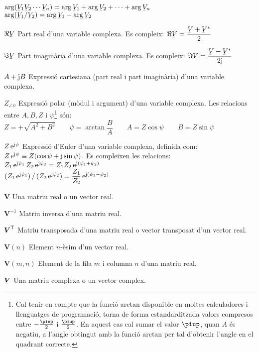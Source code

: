 \begin{list}{}
      $\arg(\cmplx{V}_1 \cmplx{V}_2 \cdots \cmplx{V}_n) = \arg\cmplx{V}_1 + \arg \cmplx{V}_2 + \cdots + \arg\cmplx{V}_n$\\[1ex]
      $\arg(\cmplx{V}_1 / \cmplx{V}_2) = \arg\cmplx{V}_1 - \arg \cmplx{V}_2$
    \item[$\Re\cmplx{V}$] Part real d'una variable complexa. Es compleix: $\Re\cmplx{V} = \dfrac{\cmplx{V} + \cmplx{V}^*}{2}$
    \item[$\Im\cmplx{V}$] Part imaginària d'una variable complexa. Es compleix: $\Im\cmplx{V} = \dfrac{\cmplx{V} - \cmplx{V}^*}{2 \ju}$
    \item[$A+\mathrm{j} B$] Expressió cartesiana (part real i part
    imaginària) d'una variable complexa.
    \item[$Z_{\angle \psi}$] Expressió polar (mòdul i argument) d'una variable
    complexa. Les relacions entre $A, B, Z$ i $\psi$\footnote{Cal tenir en compte que la funció \textsf{arctan} disponible en moltes calculadores i llenguatges de programació, torna de forma  estandarditzada valors compresos entre $-\frac{\piup}{2}$ i $\frac{\piup}{2}$. En aquest cas cal sumar el valor $\piup$, quan $A$ és negatiu, a l'angle obtingut amb la funció \textsf{arctan} per tal d'obtenir l'angle en el quadrant correcte.} són:\\[1ex]
    $Z=+\sqrt{A^2+B^2}\quad\quad\psi=\arctan{\dfrac{B}{A}}\quad\quad
    A=Z\cos\psi\quad\quad B=Z\sin\psi$
    \item[$Z\,\mathrm{e}^{\mathrm{j}\psi}$] Expressió d'Euler d'una variable complexa, definida com:
     $Z\,\mathrm{e}^{\mathrm{j}\psi} \equiv Z(\cos\psi+\mathrm{j}\sin\psi)$.
     Es compleixen les relacions:\\[1ex]
     $Z_1\,\mathrm{e}^{\mathrm{j}\psi_1} \, Z_2\,\mathrm{e}^{\mathrm{j}\psi_2} = Z_1 Z_2\,\mathrm{e}^{\mathrm{j}(\psi_1+\psi_2)}$\\[1ex]
     $(Z_1\,\mathrm{e}^{\mathrm{j}\psi_1}) \,/\, (Z_2\,\mathrm{e}^{\mathrm{j}\psi_2}) = \dfrac{Z_1}{Z_2}\,\mathrm{e}^{\mathrm{j}(\psi_1-\psi_2)}$
    \item[$\boldsymbol{V}$] Una matriu real o un vector real.
    \item[$\boldsymbol{V}^{-1}$] Matriu inversa d'una matriu real.
    \item[$\boldsymbol{V}^\mathrm{\textsf{T}}$] Matriu transposada d'una matriu real o vector
    transposat d'un vector real.
    \item[$\boldsymbol{V}(n)$] Element $n$-èsim d'un vector real.
    \item[$\boldsymbol{V}(m,n)$] Element de la fila $m$ i columna $n$ d'una matriu real.
    \item[$\mcmplx{V}$] Una matriu complexa o un vector complex.

\end{list}
